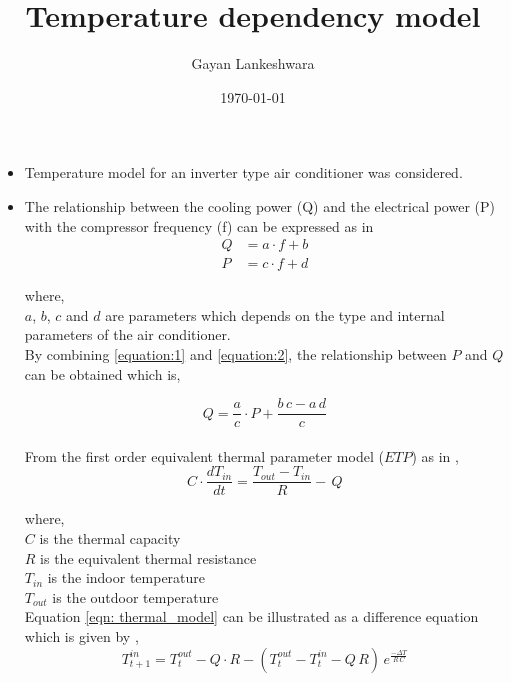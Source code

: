 \documentclass[12pt,a4paper]{article}
\title{\large\textbf{ Temperature dependency model} }
\author{\small Gayan Lankeshwara}
\date{\small \today}
\begin{document}
\maketitle

\begin{itemize}
    \item Temperature model for an inverter type air conditioner was considered.
    
    \item The relationship between the cooling power (Q) and the electrical power (P) with the compressor frequency (f) can be expressed as in \cite{7890446}
    \begin{align}
        \label{equation:1}
        Q &= a\cdot f + b \\
        \label{equation:2}
        P &= c\cdot f + d
    \end{align}
  
  where,\\

$a$, $b$, $c$ and $d$ are parameters which depends on the type and internal parameters of the air conditioner.\\

By combining \ref{equation:1} and \ref{equation:2}, the relationship between $P$ and $Q$ can be obtained which is,

\begin{equation}
    \label{eqn: P_and_Q}
    Q = \frac{a}{c}\cdot P + \frac{b\,c -a\,d}{c}
\end{equation} \\ 


From the first order equivalent thermal parameter model ($ETP$) as in \cite{6168821},
\begin{equation}
    \label{eqn: thermal_model}
    C\cdot \frac{dT_{in}}{dt} = \frac{T_{out}-T_{in}}{R} -\,Q
\end{equation}

where,\\

$C$ is the thermal capacity\\
$R$ is the equivalent thermal resistance\\
$T_{in}$ is the indoor temperature\\
$T_{out}$ is the outdoor temperature\\


Equation \eqref{eqn: thermal_model} can be illustrated as a difference equation which is given by \cite{8750809},
\begin{equation}
    \label{eq:discretised_ETP_model}
    T_{t+1}^{in} =  T_{t}^{out} - Q\cdot R - (T_{t}^{out}-T_{t}^{in}-Q\,R)\,e^{\frac{-\Delta T}{R\,C}} %
\end{equation}


\end{itemize}
\end{document}
